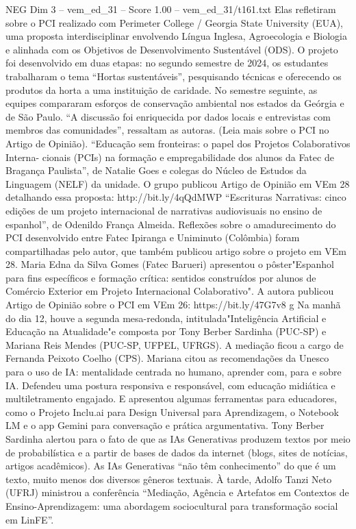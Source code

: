 \begin{textsample}{NEG Dim 3 – vem\_ed\_31 – Score 1.00 – vem\_ed\_31/t161.txt}
Elas refletiram sobre o PCI realizado com Perimeter College / Georgia State University (EUA), uma proposta interdisciplinar envolvendo Língua Inglesa, Agroecologia e Biologia e alinhada com os Objetivos de Desenvolvimento Sustentável (ODS).
O projeto foi desenvolvido em duas etapas: no segundo semestre de 2024, os estudantes trabalharam o tema “Hortas sustentáveis”, pesquisando técnicas e oferecendo os produtos da horta a uma instituição de caridade.
No semestre seguinte, as equipes compararam esforços de conservação ambiental nos estados da Geórgia e de São Paulo. “A discussão foi enriquecida por dados locais e entrevistas com membros das comunidades”, ressaltam as autoras. (Leia mais sobre o PCI no Artigo de Opinião). “Educação sem fronteiras: o papel dos Projetos Colaborativos Interna- cionais (PCIs) na formação e empregabilidade dos alunos da Fatec de Bragança Paulista”, de Natalie Goes e colegas do Núcleo de Estudos da Linguagem (NELF) da unidade.
O grupo publicou Artigo de Opinião em VEm 28 detalhando essa proposta: http://bit.ly/4qQdMWP “Escrituras Narrativas: cinco edições de um projeto internacional de narrativas audiovisuais no ensino de espanhol”, de Odenildo França Almeida.
Reflexões sobre o amadurecimento do PCI desenvolvido entre Fatec Ipiranga e Uniminuto (Colômbia) foram compartilhadas pelo autor, que também publicou artigo sobre o projeto em VEm 28.
Maria Edna da Silva Gomes (Fatec Barueri) apresentou o pôster"Espanhol para fins específicos e formação crítica: sentidos construídos por alunos de Comércio Exterior em Projeto Internacional Colaborativo".
A autora publicou Artigo de Opinião sobre o PCI em VEm 26: https://bit.ly/47G7v8 g Na manhã do dia 12, houve a segunda mesa-redonda, intitulada"Inteligência Artificial e Educação na Atualidade"e composta por Tony Berber Sardinha (PUC-SP) e Mariana Reis Mendes (PUC-SP, UFPEL, UFRGS).
A mediação ficou a cargo de Fernanda Peixoto Coelho (CPS).
Mariana citou as recomendações da Unesco para o uso de IA: mentalidade centrada no humano, aprender com, para e sobre IA.
Defendeu uma postura responsiva e responsável, com educação midiática e multiletramento engajado.
E apresentou algumas ferramentas para educadores, como o Projeto Inclu.ai para Design Universal para Aprendizagem, o Notebook LM e o app Gemini para conversação e prática argumentativa.
Tony Berber Sardinha alertou para o fato de que as IAs Generativas produzem textos por meio de probabilística e a partir de bases de dados da internet (blogs, sites de notícias, artigos acadêmicos).
As IAs Generativas “não têm conhecimento” do que é um texto, muito menos dos diversos gêneros textuais. À tarde, Adolfo Tanzi Neto (UFRJ) ministrou a conferência “Mediação, Agência e Artefatos em Contextos de Ensino-Aprendizagem: uma abordagem sociocultural para transformação social em LinFE”.

\end{textsample}
